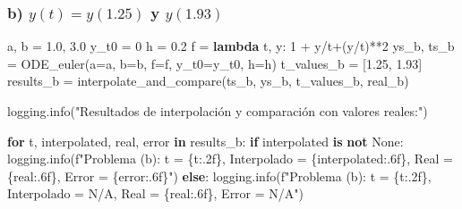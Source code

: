\documentclass[
  letterpaper,
  DIV=11,
  numbers=noendperiod]{scrartcl}
\newenvironment{Shaded}{\begin{snugshade}}{\end{snugshade}}
\newcommand{\ControlFlowTok}[1]{\textcolor[rgb]{0.00,0.23,0.31}{\textbf{#1}}}
\newcommand{\DecValTok}[1]{\textcolor[rgb]{0.68,0.00,0.00}{#1}}
\newcommand{\FloatTok}[1]{\textcolor[rgb]{0.68,0.00,0.00}{#1}}
\newcommand{\KeywordTok}[1]{\textcolor[rgb]{0.00,0.23,0.31}{\textbf{#1}}}
\newcommand{\NormalTok}[1]{\textcolor[rgb]{0.00,0.23,0.31}{#1}}
\newcommand{\OperatorTok}[1]{\textcolor[rgb]{0.37,0.37,0.37}{#1}}
\newcommand{\SpecialCharTok}[1]{\textcolor[rgb]{0.37,0.37,0.37}{#1}}
\newcommand{\SpecialStringTok}[1]{\textcolor[rgb]{0.13,0.47,0.30}{#1}}
\newcommand{\StringTok}[1]{\textcolor[rgb]{0.13,0.47,0.30}{#1}}
\newcommand{\VariableTok}[1]{\textcolor[rgb]{0.07,0.07,0.07}{#1}}
\begin{document}
\subsubsection{\texorpdfstring{b) \(y(t)=y(1.25)\) y
\(y(1.93)\)}{b) y(t)=y(1.25) y y(1.93)}}\label{b-yty1.25-y-y1.93}

\begin{Shaded}
\begin{Highlighting}[]
\NormalTok{a, b }\OperatorTok{=} \FloatTok{1.0}\NormalTok{, }\FloatTok{3.0}
\NormalTok{y\_t0 }\OperatorTok{=} \DecValTok{0}
\NormalTok{h }\OperatorTok{=} \FloatTok{0.2}
\NormalTok{f }\OperatorTok{=} \KeywordTok{lambda}\NormalTok{ t, y: }\DecValTok{1} \OperatorTok{+}\NormalTok{ y}\OperatorTok{/}\NormalTok{t}\OperatorTok{+}\NormalTok{(y}\OperatorTok{/}\NormalTok{t)}\OperatorTok{**}\DecValTok{2}
\NormalTok{ys\_b, ts\_b }\OperatorTok{=}\NormalTok{ ODE\_euler(a}\OperatorTok{=}\NormalTok{a, b}\OperatorTok{=}\NormalTok{b, f}\OperatorTok{=}\NormalTok{f, y\_t0}\OperatorTok{=}\NormalTok{y\_t0, h}\OperatorTok{=}\NormalTok{h)}
\NormalTok{t\_values\_b }\OperatorTok{=}\NormalTok{ [}\FloatTok{1.25}\NormalTok{, }\FloatTok{1.93}\NormalTok{]}
\NormalTok{results\_b }\OperatorTok{=}\NormalTok{ interpolate\_and\_compare(ts\_b, ys\_b, t\_values\_b, real\_b)}

\NormalTok{logging.info(}\StringTok{"Resultados de interpolación y comparación con valores reales:"}\NormalTok{)}

\ControlFlowTok{for}\NormalTok{ t, interpolated, real, error }\KeywordTok{in}\NormalTok{ results\_b:}
    \ControlFlowTok{if}\NormalTok{ interpolated }\KeywordTok{is} \KeywordTok{not} \VariableTok{None}\NormalTok{:}
\NormalTok{        logging.info(}\SpecialStringTok{f"Problema (b): t = }\SpecialCharTok{\{}\NormalTok{t}\SpecialCharTok{:.2f\}}\SpecialStringTok{, Interpolado = }\SpecialCharTok{\{}\NormalTok{interpolated}\SpecialCharTok{:.6f\}}\SpecialStringTok{, Real = }\SpecialCharTok{\{}\NormalTok{real}\SpecialCharTok{:.6f\}}\SpecialStringTok{, Error = }\SpecialCharTok{\{}\NormalTok{error}\SpecialCharTok{:.6f\}}\SpecialStringTok{"}\NormalTok{)}
    \ControlFlowTok{else}\NormalTok{:}
\NormalTok{        logging.info(}\SpecialStringTok{f"Problema (b): t = }\SpecialCharTok{\{}\NormalTok{t}\SpecialCharTok{:.2f\}}\SpecialStringTok{, Interpolado = N/A, Real = }\SpecialCharTok{\{}\NormalTok{real}\SpecialCharTok{:.6f\}}\SpecialStringTok{, Error = N/A"}\NormalTok{)}
\end{Highlighting}
\end{Shaded}
\end{document}
